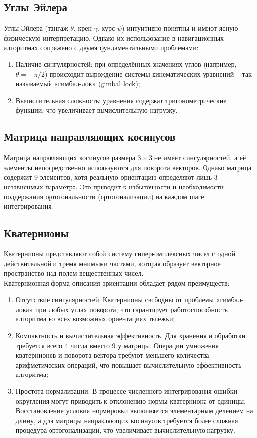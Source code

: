 \subsection{Углы Эйлера}
Углы Эйлера (тангаж $\theta$, крен $\gamma$, курс $\psi$) интуитивно понятны и имеют ясную физическую интерпретацию. Однако их использование в навигационных алгоритмах сопряжено с двумя фундаментальными проблемами:

\begin{enumerate}[label=\arabic*]
	\item Наличие сингулярностей: при определённых значениях углов (например, $\theta = \pm \pi / 2$) происходит вырождение системы кинематических уравнений – так называемый «гимбал-лок» (gimbal lock);
	\item Вычислительная сложность: уравнения содержат тригонометрические функции, что увеличивает вычислительную нагрузку.
\end{enumerate}


\subsection{Матрица направляющих косинусов}
Матрица направляющих косинусов размера $3 \times 3$ не имеет сингулярностей, а её элементы непосредственно используются для поворота векторов. Однако матрица содержит 9 элементов, хотя реальную ориентацию определяют лишь 3 независимых параметра. Это приводит к избыточности и необходимости поддержания ортогональности (ортогонализации) на каждом шаге интегрирования.


\subsection{Кватернионы}
Кватернионы представляют собой систему гиперкомплексных чисел с одной действительной и тремя мнимыми частями, которая образует векторное пространство над полем вещественных чисел.\\

Кватернионная форма описания ориентации обладает рядом преимуществ:
\begin{enumerate}
	\item Отсутствие сингулярностей. Кватернионы свободны от проблемы «гимбал-лока» при любых углах поворота, что гарантирует работоспособность алгоритма во всех возможных ориентациях тележки;
	\item Компактность и вычислительная эффективность. Для хранения и обработки требуется всего 4 числа вместо 9 у матрицы. Операции умножения кватернионов и поворота вектора требуют меньшего количества арифметических операций, что повышает вычислительную эффективность алгоритма;
	\item Простота нормализации. В процессе численного интегрирования ошибки округления могут приводить к отклонению нормы кватерниона от единицы. Восстановление условия нормировки выполняется элементарным делением на длину, а для матрицы направляющих косинусов требуется более сложная процедура ортогонализации, что увеличивает вычислительную нагрузку.
\end{enumerate}


